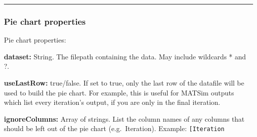 \begin{Shaded}
\begin{Highlighting}[]
\KeywordTok{:}
\AttributeTok{  }\KeywordTok{:}
\AttributeTok{    }\KeywordTok{{-}}\AttributeTok{ }\KeywordTok{:}\AttributeTok{ }
\AttributeTok{      }\KeywordTok{:}\AttributeTok{ }
\AttributeTok{      }\KeywordTok{:}\AttributeTok{ }
\AttributeTok{      }\KeywordTok{:}\AttributeTok{ }
\AttributeTok{      }\KeywordTok{:}\AttributeTok{ }
\AttributeTok{      }\KeywordTok{:}\AttributeTok{ }
\AttributeTok{      }\KeywordTok{:}\AttributeTok{ }\KeywordTok{[}\KeywordTok{]}
\end{Highlighting}
\end{Shaded}

\begin{center}\rule{0.5\linewidth}{0.5pt}\end{center}

\hypertarget{pie-chart-properties}{%
\subsubsection{Pie chart properties}\label{pie-chart-properties}}

Pie chart properties:

\textbf{dataset:} String. The filepath containing the data. May include
wildcards * and ?.

\textbf{useLastRow:} true/false. If set to true, only the last row of
the datafile will be used to build the pie chart. For example, this is
useful for MATSim outputs which list every iteration's output, if you
are only in the final iteration.

\textbf{ignoreColumns:} Array of strings. List the column names of any
columns that should be left out of the pie chart (e.g.~Iteration).
Example: \texttt{{[}\textquotesingle{}Iteration\textquotesingle{}{]}}
